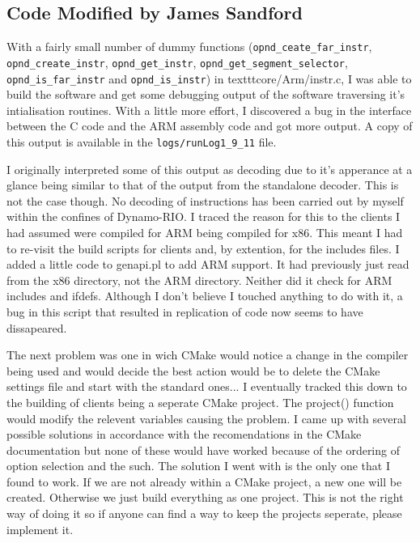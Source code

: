 \documentclass[a4paper]{article}
\begin{document}
\subsection{Code Modified by James Sandford}
With a fairly small number of dummy functions (\texttt{opnd\_ceate\_far\_instr},
\texttt{opnd\_create\_instr}, \texttt{opnd\_get\_instr},
\texttt{opnd\_get\_segment\_selector}, \texttt{opnd\_is\_far\_instr} and
\texttt{opnd\_is\_instr}) in texttt{core/Arm/instr.c}, I was able to
build the software and get some debugging output of the software traversing it's
intialisation routines. With a little more effort, I discovered a bug in the
interface between the C code and the ARM assembly code and got more output. A
copy of this output is available in the \texttt{logs/runLog1\_9\_11} file.

I originally interpreted some of this output as decoding due to
it's apperance at a glance being similar to that of the output from the
standalone decoder. This is not the case though. No decoding of instructions has
been carried out by myself within the confines of Dynamo-RIO. I traced the
reason for this to the clients I had assumed were compiled for ARM being
compiled for x86. This meant I had to re-visit the build scripts for clients
and, by extention, for the includes files. I added a little code to genapi.pl to
add ARM support. It had previously just read from the x86 directory, not the ARM
directory. Neither did it check for ARM includes and ifdefs. Although I don't
believe I touched anything to do with it, a bug in this script that resulted in
replication of code now seems to have dissapeared.

The next problem was one in wich CMake would notice a change in the compiler
being used and would decide the best action would be to delete the CMake
settings file and start with the standard ones... I eventually tracked this down
to the building of clients being a seperate CMake project. The project()
function would modify the relevent variables causing the problem. I came up with
several possible solutions in accordance with the recomendations in the CMake
documentation but none of these would have worked because of the ordering of
option selection and the such. The solution I went with is the only one that
I found to work. If we are not already within a CMake project, a new one will be
created. Otherwise we just build everything as one project. This is not the
right way of doing it so if anyone can find a way to keep the projects seperate,
please implement it.
\end{document}
